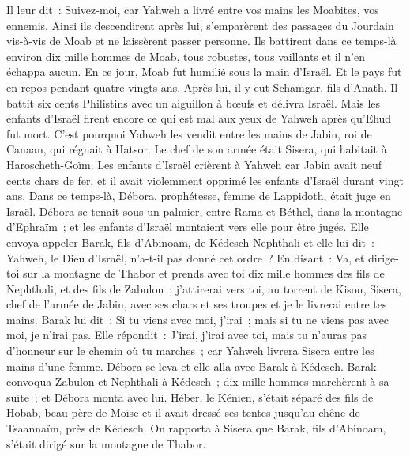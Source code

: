 \begin{multicols}{2}
Il leur dit~: Suivez-moi, car Yahweh a livré entre vos mains les Moabites, vos ennemis. Ainsi ils descendirent après lui, s'emparèrent des passages du Jourdain vis-à-vis de Moab et ne laissèrent passer personne.
Ils battirent dans ce temps-là environ dix mille hommes de Moab, tous robustes, tous vaillants et il n'en échappa aucun.
En ce jour, Moab fut humilié sous la main d'Israël. Et le pays fut en repos pendant quatre-vingts ans.
Après lui, il y eut Schamgar, fils d'Anath. Il battit six cents Philistins avec un aiguillon à bœufs et délivra Israël.
\VerseOne{}Mais les enfants d'Israël firent encore ce qui est mal aux yeux de Yahweh après qu'Ehud fut mort.
C'est pourquoi Yahweh les vendit entre les mains de Jabin, roi de Canaan, qui régnait à Hatsor. Le chef de son armée était Sisera, qui habitait à Haroscheth-Goïm.
Les enfants d'Israël crièrent à Yahweh car Jabin avait neuf cents chars de fer, et il avait violemment opprimé les enfants d'Israël durant vingt ans.
Dans ce temps-là, Débora, prophétesse, femme de Lappidoth, était juge en Israël.
Débora se tenait sous un palmier, entre Rama et Béthel, dans la montagne d'Ephraïm~; et les enfants d'Israël montaient vers elle pour être jugés.
Elle envoya appeler Barak, fils d'Abinoam, de Kédesch-Nephthali et elle lui dit~: Yahweh, le Dieu d'Israël, n'a-t-il pas donné cet ordre~? En disant~: Va, et dirige-toi sur la montagne de Thabor et prends avec toi dix mille hommes des fils de Nephthali, et des fils de Zabulon~;
j'attirerai vers toi, au torrent de Kison, Sisera, chef de l'armée de Jabin, avec ses chars et ses troupes et je le livrerai entre tes mains.
Barak lui dit~: Si tu viens avec moi, j'irai~; mais si tu ne viens pas avec moi, je n'irai pas.
Elle répondit~: J'irai, j'irai avec toi, mais tu n'auras pas d'honneur sur le chemin où tu marches~; car Yahweh livrera Sisera entre les mains d'une femme. Débora se leva et elle alla avec Barak à Kédesch.
Barak convoqua Zabulon et Nephthali à Kédesch~; dix mille hommes marchèrent à sa suite~; et Débora monta avec lui.
Héber, le Kénien, s'était séparé des fils de Hobab, beau-père de Moïse et il avait dressé ses tentes jusqu'au chêne de Tsaannaïm, près de Kédesch.
On rapporta à Sisera que Barak, fils d'Abinoam, s'était dirigé sur la montagne de Thabor.

\end{multicols}
